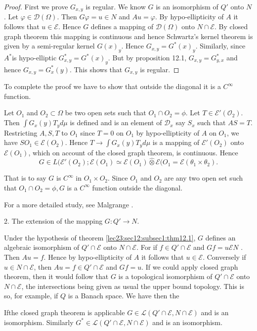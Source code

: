 \begin{proof}
First we prove $G_{x, y}$ is regular. We know $G$ is an isomorphism of
$Q'$ onto $N$. Let $\varphi \in \mathscr{D}(\Omega)$. Then $G
\varphi = u \in N$ and $Au =  \varphi$. By hypo-ellipticity of
$A$ it follows that $u \in \mathscr{E}$. Hence $G$ defines a
mapping of $\mathscr{D}(\Omega)$ onto $N \cap \mathscr{E}$. By closed
graph theorem this mapping is continuous and hence Schwartz's kernel
theorem is given by a semi-regular kernel $G(x)_y$. Hence $G_{x, y} =
G^* (x)_y$. Similarly, since $A^*$\pageoriginale is hypo-elliptic $G^{*}_{x, y} =
G^{*}(x)_y$. But by proposition 12.1, $G_{x, y} =  G^{*}_{y, x}$ and
hence $G_{x, y} = G^{*}_{x}(y)$. This shows that $G_{x, y}$ is
regular. 
\end{proof}

To complete the proof we have to show that outside the diagonal it is
a $C^\infty$ function. 

Let $O_1$ and $O_2 \subset \Omega$ be two open sets such
that $O_1 \cap O_2 = \phi$. Let $T \in
\mathscr{E'}(\mathscr{O}_2)$. Then $\int G_x (y) T_y d \mu$ is defined
and is an element of $\mathscr{D}_x$ say $S_x$ such that
$AS=T$. Restricting $A, S, T$ to $O_1$ since $T = 0$ on
$O_1$ by hypo-ellipticity of $A$ on $O_1$, we have $S
O_1 \in \mathscr{E}(O_2)$. Hence $T \to \int G_x (y) T_y d
\mu$ is a mapping of $\mathscr{E}'(O_2)$ onto
$\mathscr{E}(O_1)$, which on account of the closed graph
theorem, is continuous. Hence 
$$
G \in L (\mathscr{E'}(O_2) ; \mathscr{E} (O_1)
\simeq \mathscr{E}(O_1) \hat{\otimes} \mathscr{E}(O_1 =
\mathscr{E}(\theta_1 \times \theta_2). 
$$

That is to say $G$ is $C^\infty$ in $O_1 \times
O_2$. Since $O_1$ and $O_2$ are any two open set
such that $O_1 \cap O_2 = \phi, G$ is a $ C^\infty $
function outside the diagonal. 

\begin{remark*}
  For a more detailed study, see Malgrange \cite{k12}.

  2. The extension of the mapping $G:Q' \to N$.
\end{remark*}

Under the hypothesis of theorem \ref{lec23:sec12:subsec1:thm12.1}, $G$ defines an algebraic
isomorphism of $Q' \cap \mathscr{E}$ onto $N \cap \mathscr{E}$. For if
$f \in Q' \cap \mathscr{E}$ and $Gf = u \mathscr{E} N$ . Then
$Au = f$. Hence by hypo-ellipticity of $A$ it follows that $u
\in \mathscr{E}$. Conversely if $u \in N \cap
\mathscr{E}$, then $Au = f \in Q' \cap \mathscr{E}$ and $Gf =
u$. If we could apply closed graph theorem, then it would follow that
$G$ is a topological isomorphism of $Q' \cap \mathscr{E}$ onto $N \cap
\mathscr{E}$, the intersections being given as usual the upper bound
topology. This is so, for example, if $Q$ is a Banach space. We have
then the 
\begin{theorem}\label{lec23:sec12:subsec1:thm12.2}%
  If\pageoriginale the closed graph theorem is applicable $G \in \mathscr{L}
  (Q' \cap \mathscr{E}, N \cap \mathscr{E})$ and is an
  isomorphism. Similarly $G^* \in \mathscr{L} (Q' \cap
  \mathscr{E}, N \cap \mathscr{E})$ and is an isomorphism. 
\end{theorem}

